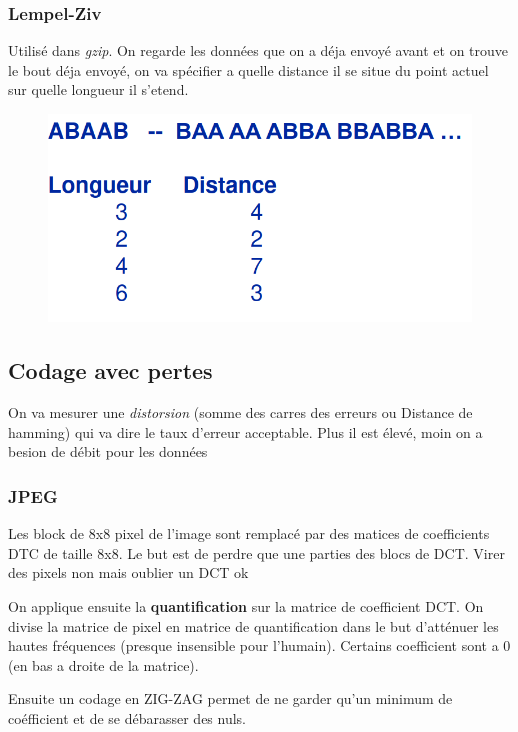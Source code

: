 		\subsubsection{Lempel-Ziv}
			Utilisé dans \textit{gzip}. On regarde les données que on a déja envoyé avant et on trouve le bout déja envoyé, on va spécifier a quelle distance il se situe du point actuel sur quelle longueur il s'etend.

			\begin{figure}[H]
				\centering
				\includegraphics[width=.5\textwidth]{img/Compression/L77.png}
			\end{figure}
			
	\subsection{Codage avec pertes}
		On va mesurer une \textit{distorsion} (somme des carres des erreurs ou Distance de hamming) qui va dire le taux d'erreur acceptable. Plus il est élevé, moin on a besion de débit pour les données
		
		\subsubsection{JPEG}
			Les block de 8x8 pixel de l'image sont remplacé par des matices de coefficients DTC de taille 8x8. Le but est de perdre que une parties des blocs de DCT. Virer des pixels non mais oublier un DCT ok
			
			On applique ensuite la \textbf{quantification} sur la matrice de coefficient DCT. On divise la matrice de pixel en matrice de quantification dans le but d'atténuer les hautes fréquences (presque insensible pour l'humain). Certains coefficient sont a 0 (en bas a droite de la matrice).
			
			Ensuite un codage en ZIG-ZAG permet de ne garder qu'un minimum de coéfficient et de se débarasser des nuls.
			
